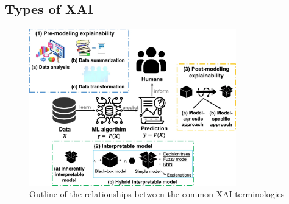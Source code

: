 \subsection{Types of XAI}
\begin{minipage}[c]{0.5\textwidth}
    \begin{figure}[H]
        \includegraphics[width=0.8\textwidth]{img/types_XAI.png}
        \centering
        \caption{Outline of the relationships between the common XAI terminologies}
    \end{figure}
\end{minipage}
